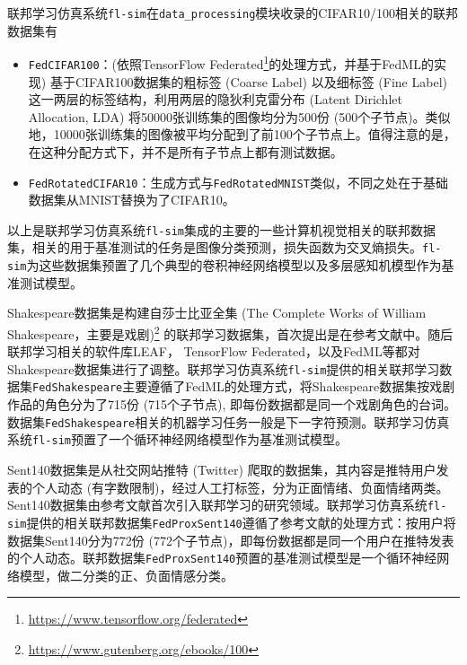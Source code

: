 联邦学习仿真系统\texttt{fl-sim}在\texttt{data\_processing}模块收录的CIFAR10/100相关的联邦数据集有
\begin{itemize}
    \item \texttt{FedCIFAR100}：(依照TensorFlow Federated\footnote{\url{https://www.tensorflow.org/federated}}的处理方式，并基于FedML\cite{he_2020_fedml}的实现) 基于CIFAR100数据集的粗标签 (Coarse Label) 以及细标签 (Fine Label) 这一两层的标签结构，利用两层的隐狄利克雷分布 (Latent Dirichlet Allocation, LDA) \cite{Li_2006_LDA}将50000张训练集的图像均分为500份 (500个子节点)。类似地，10000张训练集的图像被平均分配到了前100个子节点上。值得注意的是，在这种分配方式下，并不是所有子节点上都有测试数据。
    \item \texttt{FedRotatedCIFAR10}：生成方式与\texttt{FedRotatedMNIST}\cite{Ghosh_2022_cfl}类似，不同之处在于基础数据集从MNIST替换为了CIFAR10。
\end{itemize}

以上是联邦学习仿真系统\texttt{fl-sim}集成的主要的一些计算机视觉相关的联邦数据集，相关的用于基准测试的任务是图像分类预测，损失函数为交叉熵损失。\texttt{fl-sim}为这些数据集预置了几个典型\cite{mcmahan2017fed_avg, zhang2020fedpd, sahu2018fedprox}的卷积神经网络模型以及多层感知机模型作为基准测试模型。

Shakespeare数据集是构建自莎士比亚全集 (The Complete Works of William Shakespeare，主要是戏剧)\footnote{\url{https://www.gutenberg.org/ebooks/100}} 的联邦学习数据集，首次提出是在参考文献\parencite{mcmahan2017fed_avg}中。随后联邦学习相关的软件库LEAF\cite{caldas2018_leaf}， TensorFlow Federated，以及FedML\cite{he_2020_fedml}等都对Shakespeare数据集进行了调整。联邦学习仿真系统\texttt{fl-sim}提供的相关联邦学习数据集\texttt{FedShakespeare}主要遵循了FedML\cite{he_2020_fedml}的处理方式，将Shakespeare数据集按戏剧作品的角色分为了715份 (715个子节点), 即每份数据都是同一个戏剧角色的台词。数据集\texttt{FedShakespeare}相关的机器学习任务一般是下一字符预测。联邦学习仿真系统\texttt{fl-sim}预置了一个循环神经网络模型\cite{mcmahan2017fed_avg}作为基准测试模型。

Sent140数据集\cite{sent140}是从社交网站推特 (Twitter) 爬取的数据集，其内容是推特用户发表的个人动态 (有字数限制)，经过人工打标签，分为正面情绪、负面情绪两类。Sent140数据集由参考文献\parencite{sahu2018fedprox}首次引入联邦学习的研究领域。联邦学习仿真系统\texttt{fl-sim}提供的相关联邦数据集\texttt{FedProxSent140}遵循了参考文献\parencite{sahu2018fedprox}的处理方式：按用户将数据集Sent140分为772份 (772个子节点)，即每份数据都是同一个用户在推特发表的个人动态。联邦数据集\texttt{FedProxSent140}预置的基准测试模型是一个循环神经网络模型\cite{sahu2018fedprox}，做二分类的正、负面情感分类。

